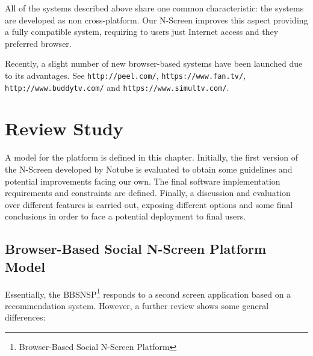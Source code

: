 \documentclass{acm_proc_article-sp}
\begin{document}
All of the systems described above share one common characteristic: the systems are developed as non cross-platform. Our N-Screen improves this aspect providing a fully compatible system, requiring to users just Internet access and they preferred browser. 

Recently, a slight number of new browser-based systems have been launched due to its advantages. See \texttt{http://peel.com/}, \texttt{https://www.fan.tv/}, \texttt{http://www.buddytv.com/} and \newline \texttt{https://www.simultv.com/}. 
\section{Review Study}
A model for the platform is defined in this chapter. Initially, the first version of the N-Screen developed by Notube\cite{aroyo2009notube} is evaluated to obtain some guidelines and potential improvements facing our own. The final software implementation requirements and constraints are defined. Finally, a discussion and evaluation over different features is carried out, exposing different options and some final conclusions in order to face a potential deployment to final users.
\subsection{Browser-Based Social N-Screen Platform Model}

Essentially, the BBSNSP\footnote{Browser-Based Social N-Screen Platform} responds to a second screen application based on a recommendation system. However, a further review shows some general differences:
\end{document}
